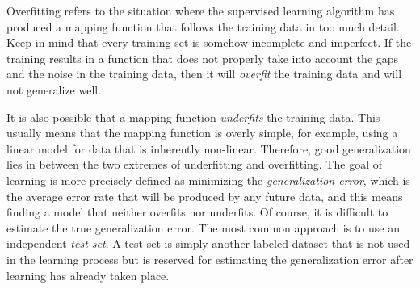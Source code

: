 
Overfitting refers to the situation where the supervised learning algorithm has produced a mapping function that follows the training data in too much detail. Keep in mind that every training set is somehow incomplete and imperfect. If the training results in a function that does not properly take into account the gaps and the noise in the training data, then it will \emph{overfit} the training data and will not generalize well.

It is also possible that a mapping function \emph{underfits} the training data. This usually means that the mapping function is overly simple, for example, using a linear model for data that is inherently non-linear. Therefore, good generalization lies in between the two extremes of underfitting and overfitting. The goal of learning is more precisely defined as minimizing the \emph{generalization error}, which is the average error rate that will be produced by any future data, and this means finding a model that neither overfits nor underfits. Of course, it is difficult to estimate the true generalization error. The most common approach is to use an independent \emph{test set}. A test set is simply another labeled dataset that is not used in the learning process but is reserved for estimating the generalization error after learning has already taken place.

